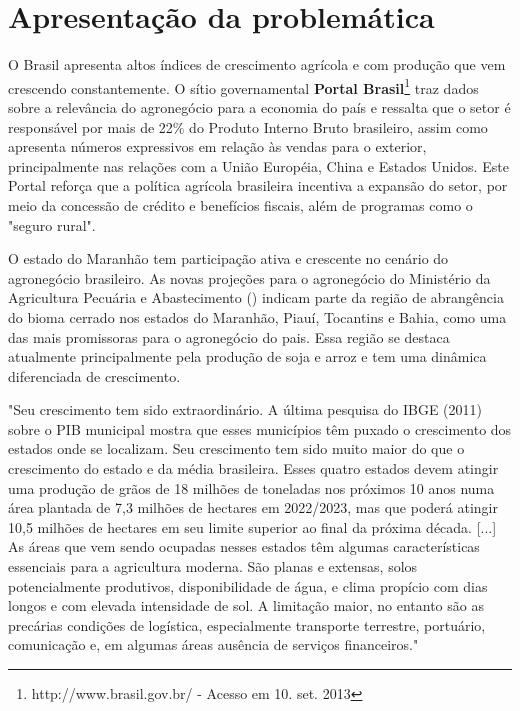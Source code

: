 \section{Apresentação da problemática}

O Brasil apresenta altos índices de crescimento agrícola e com produção que vem crescendo constantemente. O sítio governamental \textbf{Portal Brasil}\footnote{http://www.brasil.gov.br/ - Acesso em 10. set. 2013} traz dados sobre a relevância do agronegócio para a economia do país e ressalta que o setor é responsável por mais de 22\% do Produto Interno Bruto brasileiro, assim como apresenta números expressivos em relação às vendas para o exterior, principalmente nas relações com a União Européia, China e Estados Unidos. Este Portal reforça que a política agrícola brasileira incentiva a expansão do setor, por meio da concessão de crédito e benefícios fiscais, além de programas como o "seguro rural".

O estado do Maranhão tem participação ativa e crescente no cenário do agronegócio brasileiro. As novas projeções para o agronegócio do Ministério da Agricultura Pecuária e Abastecimento \citeauthor{brministerioAgricultura2013} (\citeyear{brministerioAgricultura2013}) indicam parte da região de abrangência do bioma cerrado nos estados do Maranhão, Piauí, Tocantins e Bahia, como uma das mais promissoras para o agronegócio do pais. Essa região se destaca atualmente principalmente pela produção de soja e arroz e tem uma dinâmica diferenciada de crescimento.

\begin{citacao}
"Seu crescimento tem sido extraordinário. A última pesquisa do IBGE (2011) sobre o PIB municipal mostra que esses 
municípios têm puxado o crescimento dos estados onde se localizam. Seu crescimento tem sido muito maior do que o crescimento do estado e da média brasileira. Esses quatro estados devem atingir uma produção de grãos de 18 milhões de toneladas nos próximos 10 anos numa área plantada de 7,3 milhões de hectares em 2022/2023, mas que poderá atingir 10,5 milhões de hectares em seu limite superior ao final da próxima década. [...] As áreas que vem sendo ocupadas nesses estados têm algumas características essenciais para a agricultura moderna. São planas e extensas, solos potencialmente produtivos, disponibilidade de água, e clima propício com dias longos e com elevada intensidade de sol. A limitação maior, no entanto são as precárias condições de logística, especialmente transporte terrestre, portuário, comunicação e, em algumas áreas ausência de serviços financeiros."
\cite[p. 64]{brministerioAgricultura2013}
\end{citacao}

